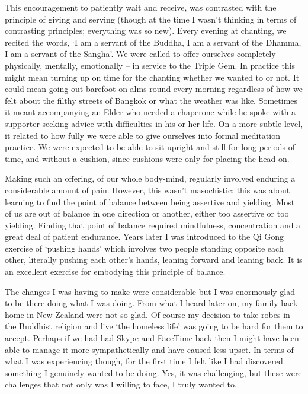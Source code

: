 This encouragement to patiently wait and receive, was contrasted with
the principle of giving and serving (though at the time I wasn't
thinking in terms of contrasting principles; everything was so new).
Every evening at chanting, we recited the words, `I am a servant of the
Buddha, I am a servant of the Dhamma, I am a servant of the Sangha'. We
were called to offer ourselves completely -- physically, mentally,
emotionally -- in service to the Triple Gem. In practice this might mean
turning up on time for the chanting whether we wanted to or not. It
could mean going out barefoot on alms-round every morning regardless of
how we felt about the filthy streets of Bangkok or what the weather was
like. Sometimes it meant accompanying an Elder who needed a chaperone
while he spoke with a supporter seeking advice with difficulties in his
or her life. On a more subtle level, it related to how fully we were
able to give ourselves into formal meditation practice. We were expected
to be able to sit upright and still for long periods of time, and
without a cushion, since cushions were only for placing the head on.

Making such an offering, of our whole body-mind, regularly involved
enduring a considerable amount of pain. However, this wasn't
masochistic; this was about learning to find the point of balance
between being assertive and yielding. Most of us are out of balance in
one direction or another, either too assertive or too yielding. Finding
that point of balance required mindfulness, concentration and a great
deal of patient endurance. Years later I was introduced to the Qi Gong
exercise of `pushing hands' which involves two people standing opposite
each other, literally pushing each other's hands, leaning forward and
leaning back. It is an excellent exercise for embodying this principle
of balance.

The changes I was having to make were considerable but I was enormously
glad to be there doing what I was doing. From what I heard later on, my
family back home in New Zealand were not so glad. Of course my decision
to take robes in the Buddhist religion and live `the homeless life' was
going to be hard for them to accept. Perhaps if we had had Skype and
FaceTime back then I might have been able to manage it more
sympathetically and have caused less upset. In terms of what I was
experiencing though, for the first time I felt like I had discovered
something I genuinely wanted to be doing. Yes, it was challenging, but
these were challenges that not only was I willing to face, I truly
wanted to.

